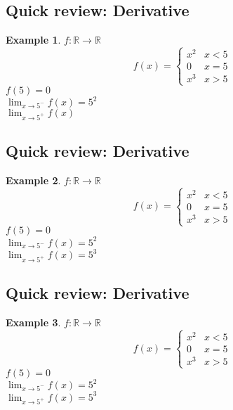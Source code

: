 \documentclass[twocolumn,20pt,fleqn]{extarticle}
\theoremstyle{plain}
\theoremstyle{definition}
\newtheorem*{example}{Example}
\theoremstyle{remark}
\begin{document}
\subsection{Quick review: Derivative}
\begin{example}
  $f : \mathbb{R}\to \mathbb{R}$
  \[f(x) =
      \begin{cases}
        x^2 & x < 5\\
        0 & x = 5\\
        x^3 & x > 5
      \end{cases}
      \]
      $f(5)=0$\\
$\displaystyle\lim_{x \to 5^-} f(x)  = 5^2$\\
$\displaystyle\lim_{x \to 5^+} f(x) $\end{example}


\clearpage



\subsection{Quick review: Derivative}
\begin{example}
  $f : \mathbb{R}\to \mathbb{R}$
  \[f(x) =
      \begin{cases}
        x^2 & x < 5\\
        0 & x = 5\\
        x^3 & x > 5
      \end{cases}
      \]
      $f(5)=0$\\
$\displaystyle\lim_{x \to 5^-} f(x)  = 5^2$\\
$\displaystyle\lim_{x \to 5^+} f(x)  = 5^3$
\end{example}





\clearpage



\subsection{Quick review: Derivative}
\begin{example}
  $f : \mathbb{R}\to \mathbb{R}$
  \[f(x) =
      \begin{cases}
        x^2 & x < 5\\
        0 & x = 5\\
        x^3 & x > 5
      \end{cases}
      \]
      $f(5)=0$\\
$\displaystyle\lim_{x \to 5^-} f(x)  = 5^2$\\
$\displaystyle\lim_{x \to 5^+} f(x)  = 5^3$
\end{example}
\end{document}
